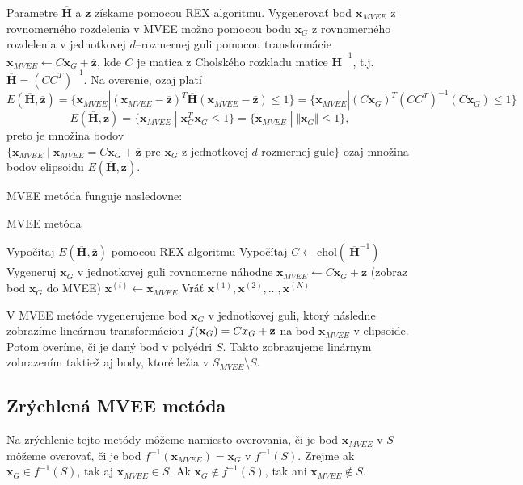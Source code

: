 Parametre $\mathbf{\overline H}$ a $\mathbf{\overline z}$ získame pomocou REX algoritmu. Vygenerovať bod $\mathbf x_{MVEE}$ z rovnomerného rozdelenia v MVEE možno pomocou bodu $\mathbf x_G$ z rovnomerného rozdelenia v jednotkovej $d$--rozmernej guli pomocou transformácie $\mathbf x_{MVEE} \leftarrow C \mathbf x_G+ \mathbf{\overline z}$, kde $C$ je matica z Cholského rozkladu matice $\mathbf{\overline H}^{-1}$, t.j. $\mathbf{\overline H}=(CC^T)^{-1}$. Na overenie, ozaj platí 
$$E(\mathbf{\overline H, \overline z})
=\{ \mathbf x_{MVEE} | (\mathbf x_{MVEE} - \mathbf{\overline z})^T \mathbf{\overline H} (\mathbf x_{MVEE}-\mathbf{\overline z}) \leq 1\}
=\{ \mathbf x_{MVEE} | (C \mathbf x_G)^T (CC^T)^{-1} (C \mathbf x_G) \leq 1 \}$$
$$E(\mathbf{\overline H, \overline z})
= \{ \mathbf x_{MVEE} \; | \; \mathbf x_G^T \mathbf x_G \leq 1 \} = \{ \mathbf x_{MVEE} \; | \;\Vert \mathbf x_G \Vert \leq 1 \},$$
preto je množina bodov $\{ \mathbf x_{MVEE} \; | \; \mathbf x_{MVEE} = C \mathbf x_G+ \mathbf{\overline z} \text{ pre } \mathbf x_G \text{ z jednotkovej $d$-rozmernej gule} \}$ ozaj množina bodov elipsoidu $E(\mathbf{\overline H, \overline z})$.

MVEE metóda funguje nasledovne:

\begin{algorithm}[H]
	\caption{MVEE metóda}
	\label{MVEE}
	\begin{algorithmic}[1]
		\State Vypočítaj $E(\mathbf{\overline H, \overline z})$ pomocou REX algoritmu
		\State Vypočítaj $C \leftarrow \text{chol}(\: \mathbf{\overline H}^{-1})$
			\Repeat
			\State Vygeneruj $\mathbf x_G$ v jednotkovej guli rovnomerne náhodne
			\State $\mathbf x_{MVEE} \leftarrow C \mathbf x_G+ \mathbf{\overline z}$ (zobraz bod $\mathbf x_G$ do MVEE)
			\State $\mathbf x^{(i)} \leftarrow \mathbf x_{MVEE}$
		\EndFor
		\State Vráť ${\mathbf x^{(1)},\mathbf x^{(2)},\dots,\mathbf x^{(N)}}$
	\end{algorithmic}
\end{algorithm}

V MVEE metóde vygenerujeme bod $\mathbf x_G$ v jednotkovej guli, ktorý následne zobrazíme lineárnou transformáciou $f(\mathbf x_G)=C \mathbf \mathbf x_G +\mathbf{\overline z}$ na bod $\mathbf x_{MVEE}$ v elipsoide. Potom overíme, či je daný bod v polyédri $S$. Takto zobrazujeme linárnym zobrazením taktiež aj body, ktoré ležia v $S_{MVEE} \setminus S$.

\subsection{Zrýchlená MVEE metóda}
Na zrýchlenie tejto metódy môžeme namiesto overovania, či je bod $\mathbf x_{MVEE}$ v $S$ môžeme overovať, či je bod $f^{-1}(\mathbf x_{MVEE})=\mathbf x_G$ v $f^{-1}(S)$. Zrejme ak $\mathbf x_G \in f^{-1}(S)$, tak aj $\mathbf x_{MVEE} \in S$. Ak $\mathbf x_G \not \in f^{-1}(S)$, tak ani $\mathbf x_{MVEE} \not \in S$.

